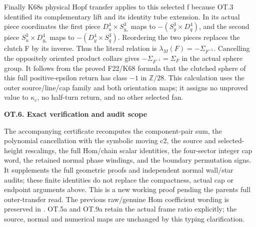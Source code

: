 Finally K68\textquotesingle s physical Hopf transfer applies to this selected f
because OT.3 identified its complementary lift and its identity
tube extension. In its actual piece coordinates the first piece
\(D^4_u\times S^3_{y_*}\) maps to
\(-(S^3_y\times D^4_q)\), and the second piece
\(S^3_u\times D^4_{y_*}\) maps to
\(-(D^4_y\times S^3_q)\). Reordering the two pieces replaces
the clutch F by its inverse. Thus the literal relation is
\(\lambda_M(F)=-\Sigma_{F^{-1}}\). Cancelling the oppositely
oriented product collars gives
\(-\Sigma_{F^{-1}}=\Sigma_F\) in the actual sphere group.
It follows from the proved F22/K68 formula that the clutched
sphere of this full positive-epsilon return has class
\(-1\) in \(\mathbb Z/28\). This calculation uses the outer
source/line/cap family and both orientation maps; it assigns no
unproved value to \(\kappa_c\), no half-turn return, and no
other selected fan.

\par

\medskip\noindent\textbf{OT.6. Exact verification and audit scope}

\par\nobreak

The accompanying certificate recomputes the component-pair sum,
the polynomial cancellation with the symbolic moving c2, the
source and selected-height rescalings, the full Hom/chain scalar
identities, the four-sector integer cap word, the retained
normal phase windings, and the boundary permutation signs.
It supplements the full geometric proofs and independent normal
wall/star audits; these finite identities do not replace the
compactness, actual cap or endpoint arguments above. This is a
new working proof pending the parent\textquotesingle s full outer-transfer read.
The previous raw/genuine Hom coefficient wording is preserved in
.
OT.5a and OT.9a retain the actual frame ratio explicitly; the
source, normal and numerical maps are unchanged by this typing
clarification.

